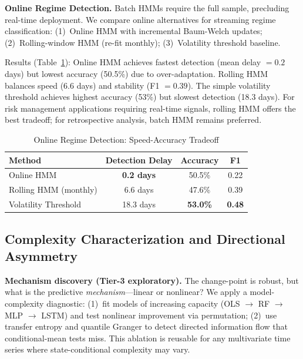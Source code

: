 \documentclass[sigconf,anonymous]{acmart}
\begin{document}
\textbf{Online Regime Detection.}
Batch HMMs require the full sample, precluding real-time deployment.
We compare online alternatives for streaming regime classification:
(1)~Online HMM with incremental Baum-Welch updates;
(2)~Rolling-window HMM (re-fit monthly);
(3)~Volatility threshold baseline.

Results (Table~\ref{tab:online}): Online HMM achieves fastest detection
(mean delay $= 0.2$ days) but lowest accuracy (50.5\%) due to over-adaptation.
Rolling HMM balances speed (6.6 days) and stability (F1 $= 0.39$).
The simple volatility threshold achieves highest accuracy (53\%) but
slowest detection (18.3 days). For risk management applications requiring
real-time signals, rolling HMM offers the best tradeoff; for retrospective
analysis, batch HMM remains preferred.

\begin{table}[t]
\centering
\caption{Online Regime Detection: Speed-Accuracy Tradeoff}
\label{tab:online}
\small
\begin{tabular}{@{}lccc@{}}
\toprule
Method & Detection Delay & Accuracy & F1 \\
\midrule
Online HMM & \textbf{0.2 days} & 50.5\% & 0.22 \\
Rolling HMM (monthly) & 6.6 days & 47.6\% & 0.39 \\
Volatility Threshold & 18.3 days & \textbf{53.0\%} & \textbf{0.48} \\
\bottomrule
\end{tabular}
\end{table}

\subsection{Complexity Characterization and Directional Asymmetry}
\label{sec:complexity}

\textbf{Mechanism discovery (Tier-3 exploratory).}
The change-point is robust, but what is the predictive
\emph{mechanism}---linear or nonlinear? We apply a model-complexity
diagnostic: (1)~fit models of increasing capacity
(OLS $\to$ RF $\to$ MLP $\to$ LSTM) and test nonlinear improvement
via permutation; (2)~use transfer entropy and quantile Granger
to detect directed information flow that conditional-mean tests miss.
This ablation is reusable for any multivariate time series where
state-conditional complexity may vary.
\end{document}
